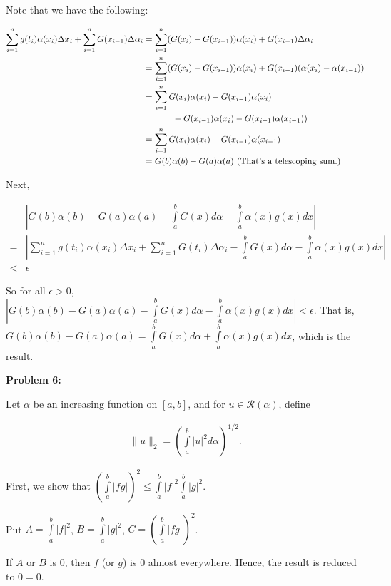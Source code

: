\documentclass[a4paper,12pt]{article}
\newcommand{\tab}{\hspace{4mm}} %
\newcommand{\shunt}{\vspace{20mm}}
\newcommand{\absval}[1]{\left\lvert #1 \right\rvert}
\newcommand{\norm}[1]{\|#1\|}
\newcommand{\al}{\alpha} %
\newcommand{\De}{\Delta}
\newcommand{\ep}{\epsilon}
\newcommand{\scrR}{\mathcal{R}}
\begin{document}
Note that we have the following:

\begin{align*}
\sum\limits_{i=1}^n g(t_i)\al(x_i) \Delta x_i + \sum\limits_{i=1}^n G(x_{i-1})\Delta \al_i &= \sum\limits_{i=1}^n (G(x_i)-G(x_{i-1})) \al(x_i) + G(x_{i-1}) \De \al_i \\
&= \sum\limits_{i=1}^n (G(x_i)-G(x_{i-1}))\al(x_i) + G(x_{i-1})(\al(x_i)-\al(x_{i-1})) \\
&= \sum\limits_{i=1}^n G(x_i)\al(x_i)-G(x_{i-1})\al(x_i) \\
& \tab \tab \tab + G(x_{i-1})\al(x_i)-G(x_{i-1})\al(x_{i-1})) \\
&= \sum\limits_{i=1}^n G(x_i)\al(x_i)-G(x_{i-1})\al(x_{i-1}) \\
&= G(b)\al(b) - G(a)\al(a) \text{ (That's a telescoping sum.)}
\end{align*}

Next,

\begin{align*}
&\absval{G(b)\al(b)-G(a)\al(a)- \int\limits_a^b G(x)d\al - \int\limits_a^b \al(x)g(x)dx} \\
=& \absval{\sum\limits_{i=1}^n g(t_i)\al(x_i) \Delta x_i + \sum\limits_{i=1}^n G(t_i)\Delta \al_i - \int\limits_a^b G(x)d\al - \int\limits_a^b \al(x)g(x)dx} \\
<& \ep
\end{align*}

So for all $\ep >0$, $\absval{G(b)\al(b)-G(a)\al(a)- \int\limits_a^b G(x)d\al - \int\limits_a^b \al(x)g(x)dx} < \ep$. That is, $G(b)\al(b)-G(a)\al(a) =  \int\limits_a^b G(x)d\al + \int\limits_a^b \al(x)g(x)dx$, which is the result.

\shunt

{\bf Problem 6:}

Let $\al$ be an increasing function on $[a,b]$, and for $u \in \scrR (\al)$, define

\begin{align*}
\norm{u}_2 = \left(\int\limits_a^b \absval{u}^2 d\al \right)^{1/2}.
\end{align*}

First, we show that $\left(\int\limits_a^b \absval{fg} \right)^2 \leq \int\limits_a^b \absval{f}^2 \int\limits_a^b \absval{g}^2$.

\tab Put $A = \int\limits_a^b \absval{f}^2$, $B = \int\limits_a^b \absval{g}^2$, $C = \left(\int\limits_a^b \absval{fg} \right)^2$. 

\tab If $A$ or $B$ is $0$, then $f$ (or $g$) is $0$ almost everywhere. Hence, the result is reduced to $0=0$.
\end{document}
